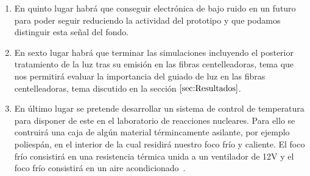 \begin{enumerate}
\item {} En quinto lugar habrá que conseguir electrónica de bajo ruido en un futuro para poder seguir reduciendo la actividad del prototipo y que podamos distinguir esta señal del fondo.

\item {} En sexto lugar habrá que terminar las simulaciones incluyendo el posterior tratamiento de la luz tras su emisión en las fibras centelleadoras, tema que nos permitirá evaluar la importancia del guiado de luz en las fibras centelleadoras, tema discutido en la sección $\ref{sec:Resultados}$.

\item {} En último lugar se pretende desarrollar un sistema de control de temperatura para disponer de este en el laboratorio de reacciones nucleares. Para ello se contruirá una caja de algún material términcamente asilante, por ejemplo poliespán, en el interior de la cual residirá nuestro foco frío y caliente. El foco frío consistirá en una resistencia térmica unida  a un ventilador de 12V y el foco frío consistirá en un aire acondicionado~\cite{Camara}.

\end{enumerate}